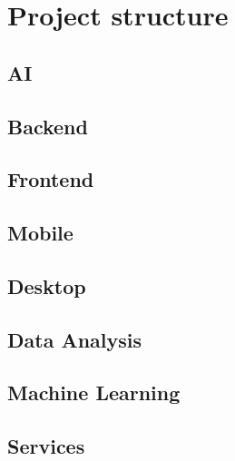 \part{Project structure}

\chapter{AI}


\chapter{Backend}


\chapter{Frontend}


\chapter{Mobile}


\chapter{Desktop}


\chapter{Data Analysis}


\chapter{Machine Learning}


\chapter{Services}
